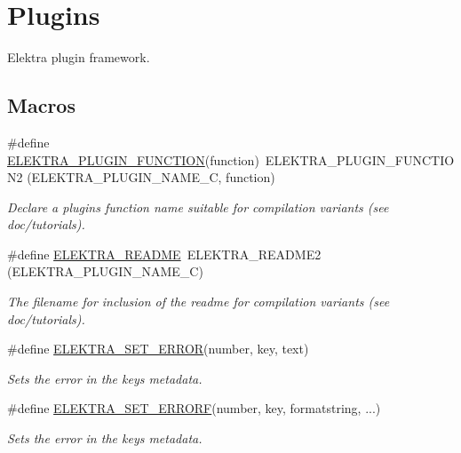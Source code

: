 \hypertarget{group__plugin}{}\section{Plugins}
\label{group__plugin}


Elektra plugin framework.  


\subsection*{Macros}
\begin{DoxyCompactItemize}
\item 
\#define \hyperlink{group__plugin_gacb05c902e4014535589db4193da87460}{E\+L\+E\+K\+T\+R\+A\+\_\+\+P\+L\+U\+G\+I\+N\+\_\+\+F\+U\+N\+C\+T\+I\+ON}(function)~E\+L\+E\+K\+T\+R\+A\+\_\+\+P\+L\+U\+G\+I\+N\+\_\+\+F\+U\+N\+C\+T\+I\+O\+N2 (E\+L\+E\+K\+T\+R\+A\+\_\+\+P\+L\+U\+G\+I\+N\+\_\+\+N\+A\+M\+E\+\_\+C, function)
\begin{DoxyCompactList}\small\item\em Declare a plugin\textquotesingle{}s function name suitable for compilation variants (see doc/tutorials). \end{DoxyCompactList}\item 
\#define \hyperlink{group__plugin_gabdcb97b05a83130c32bbde75db80fc50}{E\+L\+E\+K\+T\+R\+A\+\_\+\+R\+E\+A\+D\+ME}~E\+L\+E\+K\+T\+R\+A\+\_\+\+R\+E\+A\+D\+M\+E2 (E\+L\+E\+K\+T\+R\+A\+\_\+\+P\+L\+U\+G\+I\+N\+\_\+\+N\+A\+M\+E\+\_\+C)
\begin{DoxyCompactList}\small\item\em The filename for inclusion of the readme for compilation variants (see doc/tutorials). \end{DoxyCompactList}\item 
\#define \hyperlink{group__plugin_gaab1842b82272e6d4235b6a71587a64d9}{E\+L\+E\+K\+T\+R\+A\+\_\+\+S\+E\+T\+\_\+\+E\+R\+R\+OR}(number,  key,  text)
\begin{DoxyCompactList}\small\item\em Sets the error in the keys metadata. \end{DoxyCompactList}\item 
\#define \hyperlink{group__plugin_ga3e4fc2c20d8e64bed7a54bb1af882e34}{E\+L\+E\+K\+T\+R\+A\+\_\+\+S\+E\+T\+\_\+\+E\+R\+R\+O\+RF}(number,  key,  formatstring, ...)
\begin{DoxyCompactList}\small\item\em Sets the error in the keys metadata. \end{DoxyCompactList}\item 

\end{DoxyCompactItemize}
